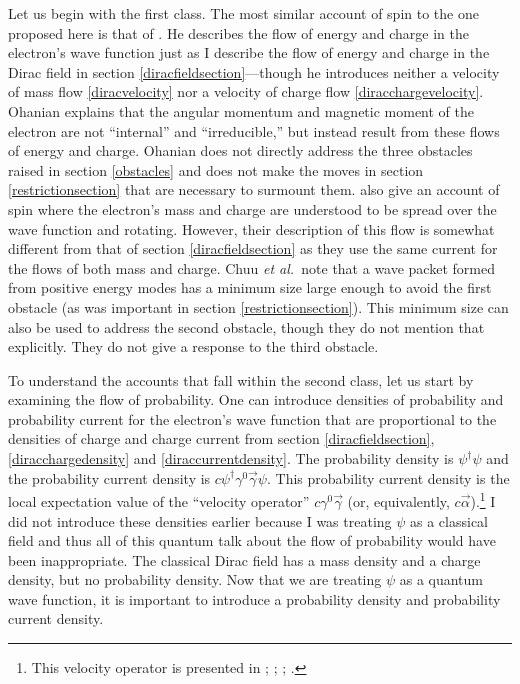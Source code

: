 \documentclass[12pt,secnumarabic,amsmath,amssymb,balancelastpage,nofootinbib]{article}
\begin{document}
Let us begin with the first class.  The most similar account of spin to the one proposed here is that of \citet{ohanian}.  He describes the flow of energy and charge in the electron's wave function just as I describe the flow of energy and charge in the Dirac field in section \ref{diracfieldsection}---though he introduces neither a velocity of mass flow \eqref{diracvelocity} nor a velocity of charge flow \eqref{diracchargevelocity}.  Ohanian explains that the angular momentum and magnetic moment of the electron are not ``internal'' and ``irreducible,'' but instead result from these flows of energy and charge.  Ohanian does not directly address the three obstacles raised in section \ref{obstacles} and does not make the moves in section \ref{restrictionsection} that are necessary to surmount them.  \citet{chuu2007} also give an account of spin where the electron's mass and charge are understood to be spread over the wave function and rotating.  However, their description of this flow is somewhat different from that of section \ref{diracfieldsection} as they use the same current for the flows of both mass and charge.  Chuu \textit{et al.\ }note that a wave packet formed from positive energy modes has a minimum size large enough to avoid the first obstacle (as was important in section \ref{restrictionsection}).  This minimum size can also be used to address the second obstacle, though they do not mention that explicitly.  They do not give a response to the third obstacle.

To understand the accounts that fall within the second class, let us start by examining the flow of probability.  One can introduce densities of probability and probability current for the electron's wave function that are proportional to the densities of charge and charge current from section \ref{diracfieldsection}, \eqref{diracchargedensity} and \eqref{diraccurrentdensity}.  The probability density is $\psi^\dagger \psi$ and the probability current density is $c\psi^\dagger\gamma^{0} \vec{\gamma}\psi$.  This probability current density is the local expectation value of the ``velocity operator'' $c\gamma^{0} \vec{\gamma}$ (or, equivalently, $c\vec{\alpha}$).\footnote{This velocity operator is presented in \citet[sections 31 and 32]{frenkel}; \citet[section 69]{dirac}; \citet[pg. 920--922]{messiah1962}; \citet[pg.\ 11]{bjorkendrell}.}  I did not introduce these densities earlier because I was treating $\psi$ as a classical field and thus all of this quantum talk about the flow of probability would have been inappropriate.  The classical Dirac field has a mass density and a charge density, but no probability density.  Now that we are treating $\psi$ as a quantum wave function, it is important to introduce a probability density and probability current density.
\end{document}
